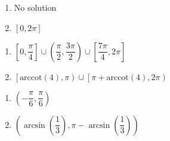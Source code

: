 \begin{multicols}{2}

\begin{enumerate}

\setcounter{enumi}{\value{HW}}

\item No solution
\item $[0, 2\pi]$

\setcounter{HW}{\value{enumi}}

\end{enumerate}

\end{multicols}

\begin{multicols}{2}

\begin{enumerate}

\setcounter{enumi}{\value{HW}}

\item  $\left[0, \dfrac{\pi}{4} \right] \cup \left(\dfrac{\pi}{2}, \dfrac{3\pi}{2}\right) \cup \left[\dfrac{7\pi}{4}, 2\pi\right]$
\item  $\left[\text{arccot}(4), \pi \right) \cup \left[ \pi + \text{arccot}(4), 2\pi\right)$ 

\setcounter{HW}{\value{enumi}}

\end{enumerate}

\end{multicols}

\begin{multicols}{2}

\begin{enumerate}

\setcounter{enumi}{\value{HW}}

\item $\left( -\dfrac{\pi}{6}, \dfrac{\pi}{6} \right)$ 
\item  $\left( \arcsin\left(\dfrac{1}{3}\right), \pi - \arcsin\left(\dfrac{1}{3}\right) \right)$ 

\setcounter{HW}{\value{enumi}}

\end{enumerate}

\end{multicols}

